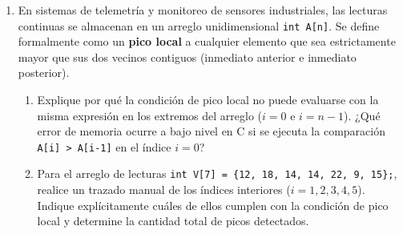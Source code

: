 \documentclass[11pt,letterpaper]{article}
\begin{document}
\begin{enumerate}[label=\textbf{\arabic*.}]
\begin{enumerate}[label=(\alph*)]
        \item Para calcular el cobro final en pesos (\$) se aplican las siguientes reglas:
        \begin{itemize}[noitemsep]
            \item Tarifa base de \$3.000 para paquetes de hasta $2.0\text{ kg}$ de peso facturable.
            \item Para pesos facturables superiores a $2.0\text{ kg}$, se cobran los \$3.000 base más \$1.200 por cada kilo (o fracción continua) excedente.
            \item Si la variable entera \texttt{es\_zona\_remota} tiene el valor \texttt{1}, se aplica un recargo adicional del 25\% sobre el costo total acumulado.
        \end{itemize}
        Escriba el fragmento de código que calcule e imprima el total a pagar formateado como número entero sin decimales.
        \vspace{5cm}
    \end{enumerate}

    \newpage

    \item En sistemas de telemetría y monitoreo de sensores industriales, las lecturas continuas se almacenan en un arreglo unidimensional \texttt{int A[n]}. Se define formalmente como un \textbf{pico local} a cualquier elemento que sea estrictamente mayor que sus dos vecinos contiguos (inmediato anterior e inmediato posterior).
    
    \begin{enumerate}[label=(\alph*)]
        \item Explique por qué la condición de pico local no puede evaluarse con la misma expresión en los extremos del arreglo ($i = 0$ e $i = n - 1$). ¿Qué error de memoria ocurre a bajo nivel en C si se ejecuta la comparación \texttt{A[i] > A[i-1]} en el índice $i = 0$?
        \vspace{3.5cm}

        \item Para el arreglo de lecturas \texttt{int V[7] = \{12, 18, 14, 14, 22, 9, 15\};}, realice un trazado manual de los índices interiores ($i = 1, 2, 3, 4, 5$). Indique explícitamente cuáles de ellos cumplen con la condición de pico local y determine la cantidad total de picos detectados.
        \vspace{5cm}


\end{enumerate}
\end{enumerate}
\end{document}
